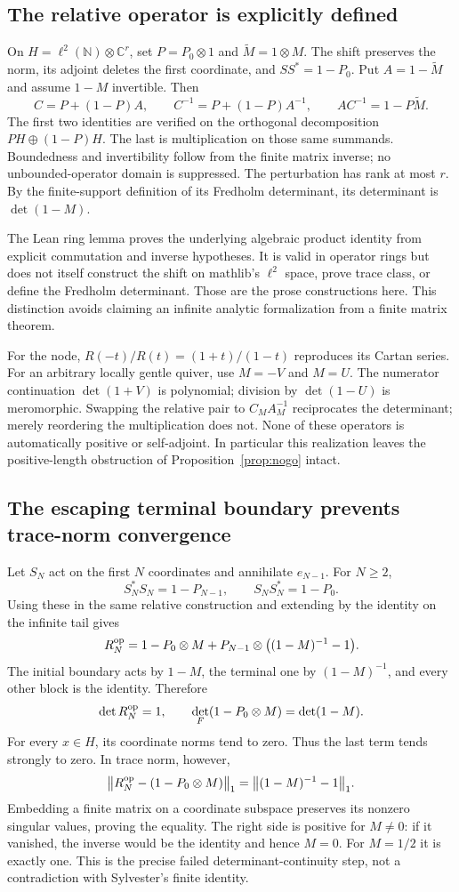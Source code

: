 \subsection{The relative operator is explicitly defined}
On $H=\ell^2(\mathbb N)\otimes\mathbb C^r$, set $P=P_0\otimes1$ and $\widetilde M=1\otimes M$. The shift preserves the norm, its adjoint deletes the first coordinate, and $SS^*=1-P_0$. Put $A=1-\widetilde M$ and assume $1-M$ invertible. Then
\[
 C=P+(1-P)A,\qquad C^{-1}=P+(1-P)A^{-1},
 \qquad AC^{-1}=1-P\widetilde M.
\]
The first two identities are verified on the orthogonal decomposition $PH\oplus(1-P)H$. The last is multiplication on those same summands. Boundedness and invertibility follow from the finite matrix inverse; no unbounded-operator domain is suppressed. The perturbation has rank at most $r$. By the finite-support definition of its Fredholm determinant, its determinant is $\det(1-M)$.

The Lean ring lemma proves the underlying algebraic product identity from explicit commutation and inverse hypotheses. It is valid in operator rings but does not itself construct the shift on mathlib's $\ell^2$ space, prove trace class, or define the Fredholm determinant. Those are the prose constructions here. This distinction avoids claiming an infinite analytic formalization from a finite matrix theorem.

For the node, $R(-t)/R(t)=(1+t)/(1-t)$ reproduces its Cartan series. For an arbitrary locally gentle quiver, use $M=-V$ and $M=U$. The numerator continuation $\det(1+V)$ is polynomial; division by $\det(1-U)$ is meromorphic. Swapping the relative pair to $C_MA_M^{-1}$ reciprocates the determinant; merely reordering the multiplication does not. None of these operators is automatically positive or self-adjoint. In particular this realization leaves the positive-length obstruction of Proposition~\ref{prop:nogo} intact.

\subsection{The escaping terminal boundary prevents trace-norm convergence}
Let $S_N$ act on the first $N$ coordinates and annihilate $e_{N-1}$. For $N\ge2$,
\[
 S_N^*S_N=1-P_{N-1},\qquad S_NS_N^*=1-P_0.
\]
Using these in the same relative construction and extending by the identity on the infinite tail gives
\[
 R_N^{\rm op}=1-P_0\otimes M
     +P_{N-1}\otimes\bigl((1-M)^{-1}-1\bigr).
\]
The initial boundary acts by $1-M$, the terminal one by $(1-M)^{-1}$, and every other block is the identity. Therefore
\[
 \det R_N^{\rm op}=1,\qquad
 \det_F(1-P_0\otimes M)=\det(1-M).
\]
For every $x\in H$, its coordinate norms tend to zero. Thus the last term tends strongly to zero. In trace norm, however,
\[
 \bigl\|R_N^{\rm op}-(1-P_0\otimes M)\bigr\|_1
   =\bigl\|(1-M)^{-1}-1\bigr\|_1.
\]
Embedding a finite matrix on a coordinate subspace preserves its nonzero singular values, proving the equality. The right side is positive for $M\ne0$: if it vanished, the inverse would be the identity and hence $M=0$. For $M=1/2$ it is exactly one. This is the precise failed determinant-continuity step, not a contradiction with Sylvester's finite identity.

